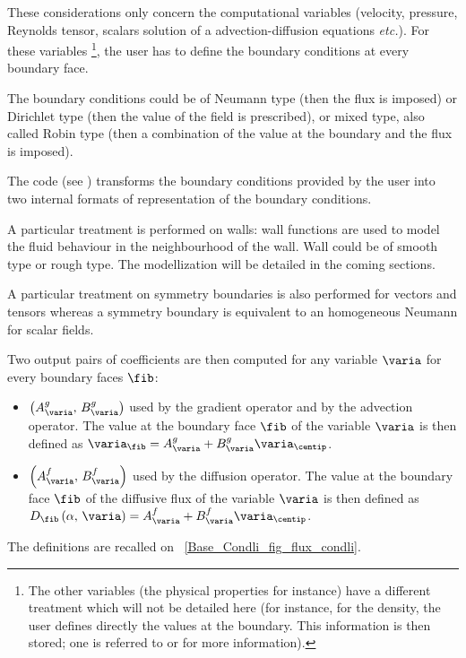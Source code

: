 These considerations only concern the computational variables  
(velocity, pressure, Reynolds tensor, 
scalars solution of a advection-diffusion equations \emph{etc.}). For these variables
\footnote{
The other variables 
(the physical properties for instance) have a different treatment which will 
not be detailed here (for instance, for the density, the user defines 
directly the values at the boundary. This information is then stored; one 
is referred to  or  for more information).
},
the user has to define the boundary conditions at every boundary face.

The boundary conditions could be of Neumann type (then the flux is imposed)
or Dirichlet type (then the value of the field is prescribed), or mixed type, also 
called Robin type (then a combination of the value at the boundary and the flux
is imposed).

The code (see ) transforms the boundary conditions provided by the user
 into two internal formats of representation of the boundary 
 conditions. 
 
 A particular treatment is performed on walls:
 wall functions are used to model the fluid behaviour in the neighbourhood of the wall.
 Wall could be of smooth type or rough type. The modellization will be detailed in the
 coming sections.
 
A particular treatment on symmetry boundaries is also performed for vectors and tensors
whereas a symmetry boundary is equivalent to an homogeneous Neumann for scalar fields.

Two output pairs of coefficients are then computed for any variable $\varia$ for every boundary faces $\fib$:

\begin{itemize}
\item $\left( A^g_\varia , \, B^g_\varia\right)$ used by the gradient operator and by the advection operator. 
The value at the boundary face $\fib$ of the variable $\varia$ is 
then defined as $\varia_\fib = A^g_\varia + B^g_\varia \varia_\centip $. 
\item $\left( A^f_\varia , \, B^f_\varia\right)$ used by the diffusion operator.
The value at the boundary face $\fib$ of the diffusive flux of the variable $\varia$ 
is then defined as $D_\fib \left( \alpha , \, \varia \right) = A^f_\varia + B^f_\varia \varia_\centip $.
\end{itemize}
The definitions are recalled on \figurename~\ref{Base_Condli_fig_flux_condli}.

